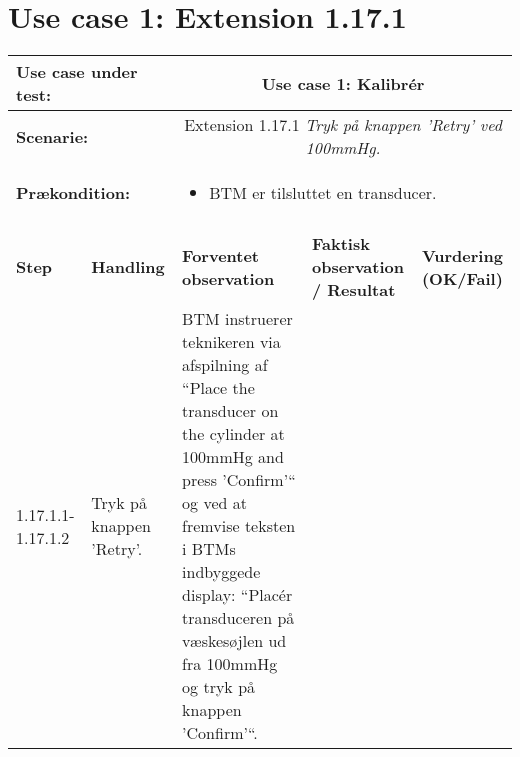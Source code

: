 \section{Use case 1: Extension 1.17.1}
\begin{tabular}{|p{1.5cm}|p{3cm}|p{4cm}|p{4cm}|p{2cm}|}
\hline
\multicolumn{2}{|p{3cm}|}{\textbf{Use case under test:}} & \multicolumn{3}{c|}{Use case 1: Kalibrér } \\\hline

\multicolumn{2}{|p{3cm}|}{\textbf{Scenarie:}} & \multicolumn{3}{c|}{Extension 1.17.1 \textit{Tryk på knappen 'Retry' ved 100mmHg.}} \\\hline
\multicolumn{2}{|p{3cm}|}{\textbf{Prækondition:}}  & \multicolumn{3}{l|}{\parbox{0.6\textwidth}{
\begin{itemize}[label=$\circ$]
\item BTM er tilsluttet en transducer. 
\end{itemize} }}\\\hline

\multicolumn{5}{|c|}{} \\\hline

\textbf{Step} & \textbf{Handling} & \textbf{Forventet observation} & \textbf{Faktisk observation / Resultat} & \textbf{Vurdering (OK/Fail)}\\\hline

1.17.1.1-1.17.1.2 & Tryk på knappen 'Retry'. & BTM instruerer teknikeren via afspilning af “Place the
transducer on the cylinder at 100mmHg and press ’Confirm’“
og ved at fremvise teksten i BTMs indbyggede
display: “Placér transduceren på væskesøjlen ud fra
100mmHg og tryk på knappen ’Confirm’“. & & \\\hline

\end{tabular}



